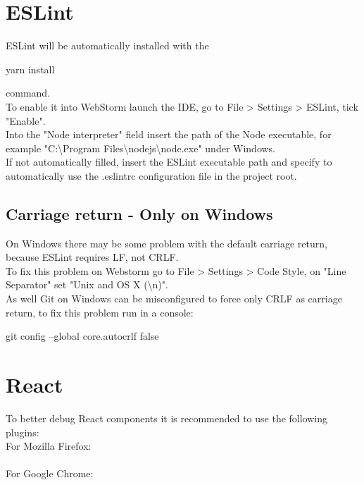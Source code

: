 \documentclass[ManualeSviluppatore]{subfiles}
\begin{document}
\section{ESLint}
ESLint will be automatically installed with the \begin{ttfamily}yarn install \end{ttfamily}command. \\
To enable it into WebStorm launch the IDE, go to File \textgreater{} Settings \textgreater{} ESLint, tick "Enable". \\
Into the "Node interpreter" field insert the path of the Node executable, for example "C:\textbackslash Program Files\textbackslash nodejs\textbackslash node.exe" under Windows. \\
If not automatically filled, insert the ESLint executable path and specify to automatically use the .eslintrc configuration file in the project root.\\

\subsection{Carriage return - Only on Windows}
On Windows there may be some problem with the default carriage return, because ESLint requires LF, not CRLF. \\
To fix this problem on Webstorm go to File \textgreater{} Settings \textgreater{} Code Style, on "Line Separator" set "Unix and OS X (\textbackslash{}n)". \\
As well Git on Windows can be misconfigured to force only CRLF as carriage return, to fix this problem run in a console: \\
\begin{ttfamily}git config --global core.autocrlf false \end{ttfamily}

\section{React}
To better debug React components it is recommended to use the following plugins: \\
For Mozilla Firefox: \\
 \\
For Google Chrome: \\
 \\
\end{document}
